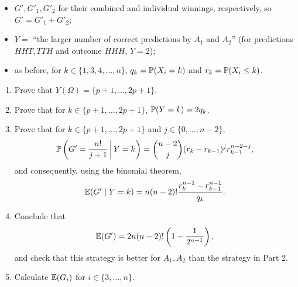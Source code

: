 \documentclass[11pt,a4paper]{article}
\begin{document}
\begin{problem}[5 points]
\begin{itemize}
\item $G',G'_1,G'_2$ for their combined and individual winnings, respectively,
so $G'=G'_1+G'_2$;
\item $Y=$ ``the larger number of correct predictions by $A_1$ and $A_2$''
(for predictions $HHT,TTH$ and outcome $HHH$, $Y=2$);
\item as before, for $k\in\{1,3,4,\ldots,n\}$, $q_k=\P(X_i=k)$ and $r_k=\P(X_i\le k)$.
\end{itemize}
\begin{enumerate}
\item Prove that $Y(\Omega)=\{p+1,\ldots,2p+1\}$.
\item Prove that for $k\in\{p+1,\ldots,2p+1\}$, $\P(Y=k)=2q_k$.
\item Prove that for $k\in\{p+1,\ldots,2p+1\}$ and $j\in\{0,\ldots,n-2\}$,
\[\P\left(G'=\frac{n!}{j+1}\,\middle|\,Y=k\right)
=\binom{n-2}{j}(r_k-r_{k-1})^j r_{k-1}^{n-2-j},\]
and consequently, using the binomial theorem,
\[\E(G'\mid Y=k)=n(n-2)!\frac{r_k^{n-1}-r_{k-1}^{n-1}}{q_k}.\]
\item Conclude that
\[\E(G')=2n(n-2)!\left(1-\frac1{2^{n-1}}\right),\]
and check that this strategy is better for $A_1,A_2$ than the strategy in Part 2.
\item Calculate $\E(G_i)$ for $i\in\{3,\ldots,n\}$.
\end{enumerate}
\end{problem}
\end{document}
